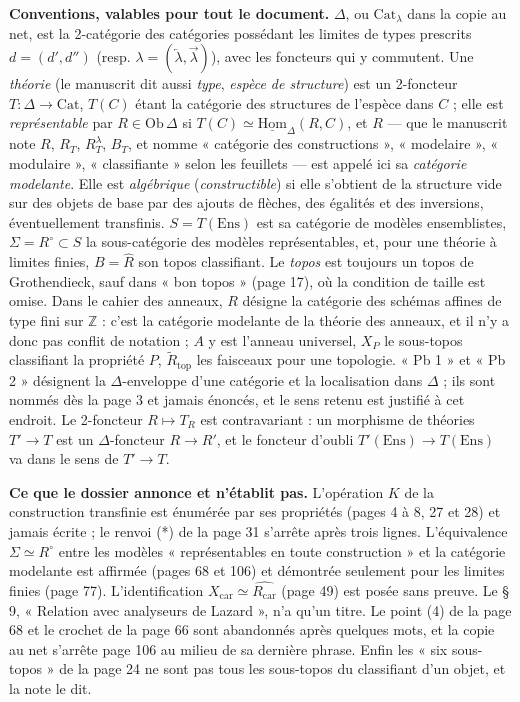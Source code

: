 \documentclass[11pt,a4paper]{article}
\begin{document}
\textbf{Conventions, valables pour tout le document.} $\Delta$, ou
$\mathrm{Cat}_{\lambda}$ dans la copie au net, est la 2-catégorie des
catégories possédant les limites de types prescrits $d = (d', d'')$ (resp.
$\lambda = (\overleftarrow{\lambda}, \overrightarrow{\lambda})$), avec les
foncteurs qui y commutent. Une \emph{théorie} (le manuscrit dit aussi
\emph{type}, \emph{espèce de structure}) est un 2-foncteur $T : \Delta \to
\mathrm{Cat}$, $T(C)$ étant la catégorie des structures de l'espèce dans
$C$ ; elle est \emph{représentable} par $R \in \mathrm{Ob}\,\Delta$ si $T(C)
\simeq \underline{\mathrm{Hom}}_{\Delta}(R, C)$, et $R$ — que le manuscrit
note $R$, $R_{T}$, $R^{\lambda}_{T}$, $B_{T}$, et nomme « catégorie des
constructions », « modelaire », « modulaire », « classifiante » selon les
feuillets — est appelé ici sa \emph{catégorie modelante}. Elle est
\emph{algébrique} (\emph{constructible}) si elle s'obtient de la structure
vide sur des objets de base par des ajouts de flèches, des égalités et des
inversions, éventuellement transfinis. $S = T(\mathrm{Ens})$ est sa catégorie
de modèles ensemblistes, $\Sigma = R^{\circ} \subset S$ la sous-catégorie
des modèles représentables, et, pour une théorie à limites finies, $B =
\widehat{R}$ son topos classifiant. Le \emph{topos} est toujours un topos
de Grothendieck, sauf dans « bon topos » (page 17), où la condition de
taille est omise. Dans le cahier des anneaux, $R$ désigne la catégorie des
schémas affines de type fini sur $\mathbb{Z}$ : c'est la catégorie
modelante de la théorie des anneaux, et il n'y a donc pas conflit de
notation ; $A$ y est l'anneau universel, $X_{P}$ le sous-topos classifiant
la propriété $P$, $\widetilde{R}_{\mathrm{top}}$ les faisceaux pour une
topologie. « Pb 1 » et « Pb 2 » désignent la $\Delta$-enveloppe d'une
catégorie et la localisation dans $\Delta$ ; ils sont nommés dès la page 3
et jamais énoncés, et le sens retenu est justifié à cet endroit. Le
2-foncteur $R \mapsto T_{R}$ est contravariant : un morphisme de théories
$T' \to T$ est un $\Delta$-foncteur $R \to R'$, et le foncteur d'oubli
$T'(\mathrm{Ens}) \to T(\mathrm{Ens})$ va dans le sens de $T' \to T$.

\textbf{Ce que le dossier annonce et n'établit pas.} L'opération $K$ de la
construction transfinie est énumérée par ses propriétés (pages 4 à 8, 27
et 28) et jamais écrite ; le renvoi (*) de la page 31 s'arrête après trois
lignes. L'équivalence $\Sigma \simeq R^{\circ}$ entre les modèles
« représentables en toute construction » et la catégorie modelante est
affirmée (pages 68 et 106) et démontrée seulement pour les limites finies
(page 77). L'identification $X_{\mathrm{car}} \simeq \widehat{R_{\mathrm{car}}}$
(page 49) est posée sans preuve. Le § 9, « Relation avec analyseurs de
Lazard », n'a qu'un titre. Le point (4) de la page 68 et le crochet de la
page 66 sont abandonnés après quelques mots, et la copie au net s'arrête
page 106 au milieu de sa dernière phrase. Enfin les « six sous-topos » de
la page 24 ne sont pas tous les sous-topos du classifiant d'un objet, et
la note le dit.
\end{document}
